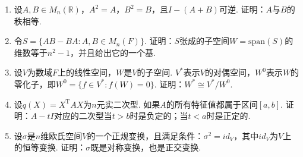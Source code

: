 \documentclass{article}
\begin{document}
\begin{enumerate}
\begin{enumerate}
\item
设$A,B\in M_n(\mathbb{R})$，$A^2=A$，$B^2=B$，且$I-(A+B)$可逆. 证明：$A$与$B$的秩相等.
\item
令$S=\{AB-BA:A,B\in M_n(F)\}$. 证明：$S$张成的子空间$W=\mathrm{span}(S)$的维数等于$n^2-1$，并且给出它的一个基.
\item
设$V$为数域$F$上的线性空间，$W$是$V$的子空间. $V^*$表示$V$的对偶空间，$W^0$表示$W$的零化子，即$W^0=\{f\in V^*:f(W)=0\}$. 证明：$W^*\cong V^*/W^0$.
\item
设$q(X)=X^\mathrm{T}AX$为$n$元实二次型. 如果$A$的所有特征值都属于区间$[a,b]$. 证明：$A-tI$对应的二次型当$t>b$时是负定的；当$t<a$时是正定的.
\item
设$\sigma$是$n$维欧氏空间$V$的一个正规变换，且满足条件：$\sigma^2=id_V$，其中$id_V$为$V$上的恒等变换. 证明：$\sigma$既是对称变换，也是正交变换.
\end{enumerate}
\end{enumerate}
\end{document}
